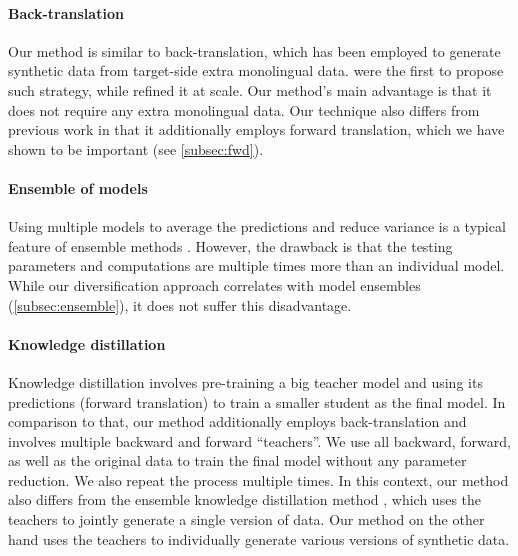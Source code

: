 \documentclass{article}
\begin{document}
\vspace{-0.5em}
\paragraph{Back-translation} Our method is similar to back-translation, which has been employed to generate synthetic data from target-side extra monolingual data. \citet{backtranslate_sennrich-etal-2016-improving} were the first to propose such strategy, while \citet{understanding_backtranslation_scale} refined it at scale. Our method's main advantage is that it does not require any extra monolingual data. Our technique also differs from previous work in that it additionally employs forward translation, which we have shown to be important (see \cref{subsec:fwd}). 

\vspace{-0.5em}
\paragraph{Ensemble of models} Using multiple models to average the predictions and reduce variance is a typical feature of ensemble methods \citep{when_net_disaggree_perrone1992networks}. However, 
the drawback is that the testing parameters and computations are multiple times more than an individual model. {While our diversification approach correlates with model ensembles (\cref{subsec:ensemble})}, it does not suffer this disadvantage. 



\vspace{-0.5em}
\paragraph{Knowledge distillation} Knowledge distillation \citep{knowledge_distill_kim_rush_2016,bornagain_pmlr-v80-furlanello18a} involves pre-training a {big teacher} model and using its predictions (forward translation) to train a {smaller student} as the final model. In comparison to that, our method additionally employs back-translation and involves multiple backward and forward ``teachers''. We use all backward, forward, as well as the original data to train the final model without any  parameter reduction. We also repeat the process multiple times. 
 In this context, our method also differs from the ensemble knowledge distillation method  \citep{ensemble_distill_freitag2017}, which uses the teachers to jointly generate a single version of data. Our method on the other hand uses the teachers to individually generate various versions of synthetic data. 
\end{document}
